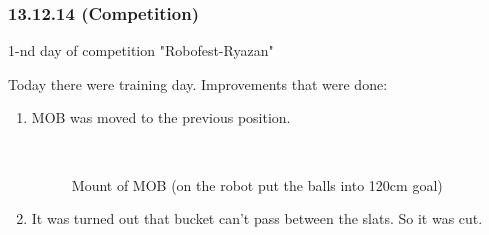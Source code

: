 \subsubsection{13.12.14 (Competition)}
\begin{center}
	1-nd day of competition "Robofest-Ryazan"
\end{center}
Today there were training day.
Improvements that were done:
\begin{enumerate}
	\item MOB was moved to the previous position. 
	
		\begin{figure}[H]
			\begin{minipage}[h]{0.2\linewidth}
				\center  
			\end{minipage}
			\begin{minipage}[h]{0.6\linewidth}
				\caption{Mount of MOB (on the robot put the balls into 120cm goal)}
			\end{minipage}
		\end{figure}
	\item It was turned out that bucket can't pass between the slats. So it was cut.
	

\end{enumerate}
